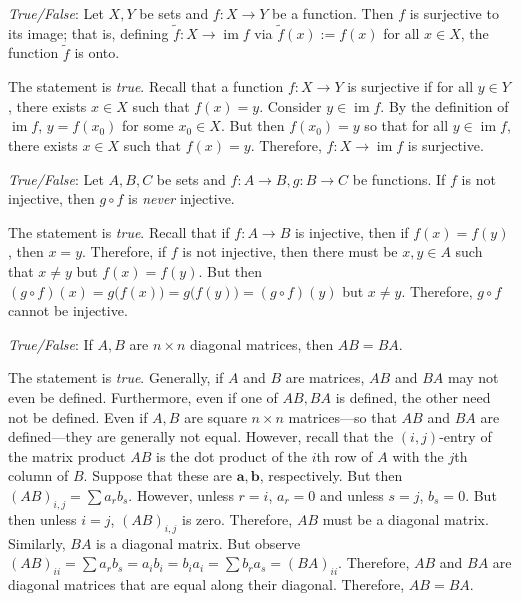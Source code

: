 \documentclass[11pt,letterpaper]{article}
\DeclareMathOperator{\im}{im}
\begin{document}
\newpage



\quizsol \textit{True/False}: Let $X, Y$ be sets and $f: X \to Y$ be a function. Then $f$ is surjective to its image; that is, defining $\widetilde{f}: X \to \im f$ via $\widetilde{f}(x):= f(x)$ for all $x \in X$, the function $\widetilde{f}$ is onto. \pspace

\sol The statement is \textit{true}. Recall that a function $f: X \to Y$ is surjective if for all $y \in Y$, there exists $x \in X$ such that $f(x)= y$. Consider $y \in \im f$. By the definition of $\im f$, $y= f(x_0)$ for some $x_0 \in X$. But then $f(x_0)= y$ so that for all $y \in \im f$, there exists $x \in X$ such that $f(x)= y$. Therefore, $f: X \to \im f$ is surjective. \pvspace{1.3cm}



\quizsol \textit{True/False}: Let $A, B, C$ be sets and $f: A \to B, g: B \to C$ be functions. If $f$ is not injective, then $g \circ f$ is \textit{never} injective. \pspace

\sol The statement is \textit{true}. Recall that if $f: A \to B$ is injective, then if $f(x)= f(y)$, then $x= y$. Therefore, if $f$ is not injective, then there must be $x, y \in A$ such that $x \neq y$ but $f(x)= f(y)$. But then $(g \circ f)(x)= g \big( f(x) \big)= g \big( f(y) \big)= (g \circ f)(y)$ but $x \neq y$. Therefore, $g \circ f$ cannot be injective. \pvspace{1.3cm}



\quizsol \textit{True/False}: If $A, B$ are $n \times n$ diagonal matrices, then $AB= BA$. \pspace

\sol The statement is \textit{true}. Generally, if $A$ and $B$ are matrices, $AB$ and $BA$ may not even be defined. Furthermore, even if one of $AB, BA$ is defined, the other need not be defined. Even if $A, B$ are square $n \times n$ matrices---so that $AB$ and $BA$ are defined---they are generally not equal. However, recall that the $(i,j)$-entry of the matrix product $AB$ is the dot product of the $i$th row of $A$ with the $j$th column of $B$. Suppose that these are $\mathbf{a}, \mathbf{b}$, respectively. But then $(AB)_{i,j}= \sum a_r b_s$. However, unless $r= i$, $a_r= 0$ and unless $s= j$, $b_s= 0$. But then unless $i= j$, $(AB)_{i, j}$ is zero. Therefore, $AB$ must be a diagonal matrix. Similarly, $BA$ is a diagonal matrix. But observe $(AB)_{ii}= \sum a_r b_s= a_i b_i= b_i a_i= \sum b_r a_s= (BA)_{ii}$. Therefore, $AB$ and $BA$ are diagonal matrices that are equal along their diagonal. Therefore, $AB= BA$. \pvspace{1.3cm}
\end{document}
